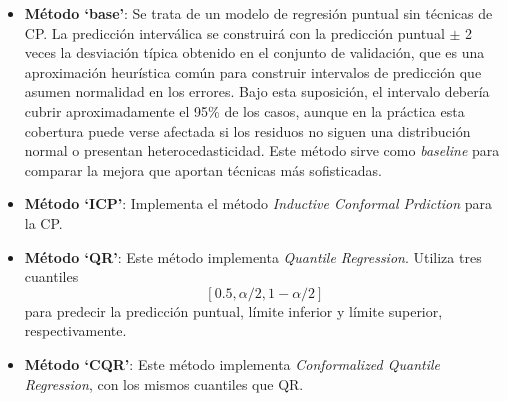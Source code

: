 \begin{itemize}

    \item \textbf{Método `base'}: Se trata de un modelo de regresión puntual sin técnicas de \acrshort{CP}. La predicción interválica se construirá con la predicción puntual $\pm$ 2 veces la desviación típica obtenido en el conjunto de validación, que es una aproximación heurística común para construir intervalos de predicción que asumen normalidad en los errores.
    Bajo esta suposición, el intervalo debería cubrir aproximadamente el 95\% de los casos, aunque en la práctica esta cobertura puede verse afectada si los residuos no siguen una distribución normal o presentan heterocedasticidad.
    Este método sirve como \textit{baseline} para comparar la mejora que aportan técnicas más sofisticadas.

    \item \textbf{Método `ICP'}: Implementa el método \textit{Inductive Conformal Prdiction} para la \acrshort{CP}. 
    
    \item \textbf{Método `QR'}: Este método implementa \textit{Quantile Regression}. Utiliza tres cuantiles 
    $$
    [0.5, \alpha/2, 1-\alpha/2]
    $$ 
    para predecir la predicción puntual, límite inferior y límite superior, respectivamente.

    \item \textbf{Método `CQR'}: Este método implementa \textit{Conformalized Quantile Regression}, con los mismos cuantiles que \acrshort{QR}. 

\end{itemize} 


